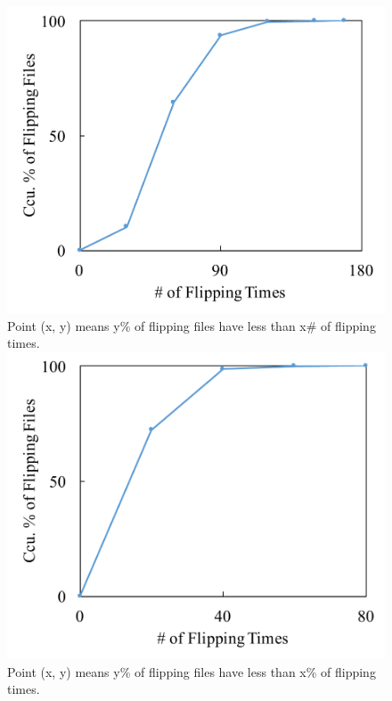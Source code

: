 \begin{figure}[!htb]
  \includegraphics[width=\linewidth]{figure/flip_file}
  {Point (x, y) means y\% of flipping files have less than x\# of flipping times.}
\endminipage\hfill
{}
  \includegraphics[width=\linewidth]{figure/flip_file_smooth}
  {Point (x, y) means y\% of flipping files have less than x\% of flipping times.}

\end{figure}
